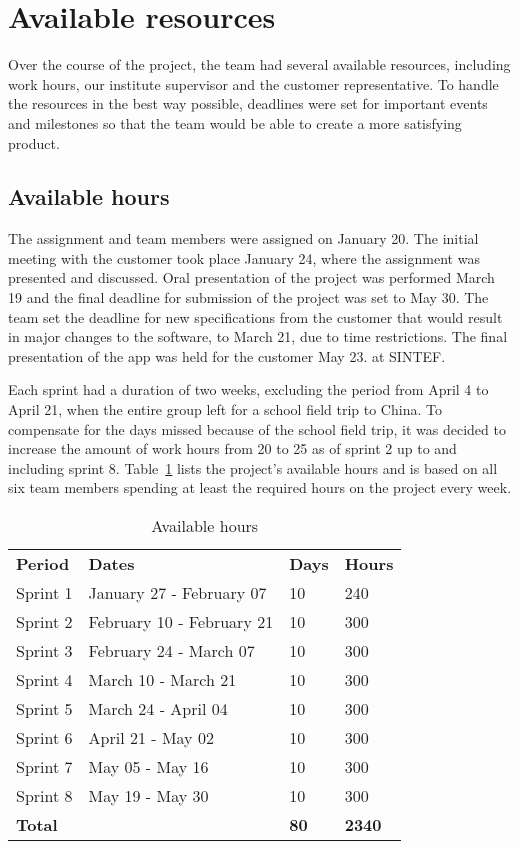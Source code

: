\newpage
\section{Available resources}
\label{sec:availResources}
Over the course of the project, the team had several available resources, including work hours, our institute supervisor and the customer representative. To handle the resources in the best way possible, deadlines were set for important events and milestones so that the team would be able to create a more satisfying product.


\subsection{Available hours}
The assignment and team members were assigned on January 20. The initial meeting with the customer took place January 24, where the assignment was presented and discussed. Oral presentation of the project was performed March 19 and the final deadline for submission of the project was set to May 30. The team set the deadline for new specifications from the customer that would result in major changes to the software, to March 21, due to time restrictions. The final presentation of the app was held for the customer May 23. at SINTEF.

Each sprint had a duration of two weeks, excluding the period from April 4 to April 21, when the entire group left for a school field trip to China. To compensate for the days missed because of the school field trip, it was decided to increase the amount of work hours from 20 to 25 as of sprint 2 up to and including sprint 8. Table~\ref{tab:availHours} lists the project's available hours and is based on all six team members spending at least the required hours on the project every week.


\begin{table}[H]
\centering
{}
\begin{tabular}{|l|l|l|l|}
\hline
\textbf{Period} & \textbf{Dates} & \textbf{Days} & \textbf{Hours}\\
Sprint 1& January 27 - February 07 & 10  & 240 \\
Sprint 2 & February 10 - February 21 &10  & 300 \\
Sprint 3 & February 24 - March 07 &10 & 300 \\
Sprint 4 & March 10 - March 21 &10  &300 \\
Sprint 5 & March 24 - April 04 &10&  300 \\
Sprint 6 & April 21 - May 02 &10  &300 \\
Sprint 7 & May 05 - May 16 &10  &300 \\
Sprint 8 & May 19 - May 30 &10  &300 \\
\textbf{Total}&& \textbf{80}&  \textbf{2340}\\\hline
\end{tabular}
\caption{Available hours}
\label{tab:availHours}
\end{table}


